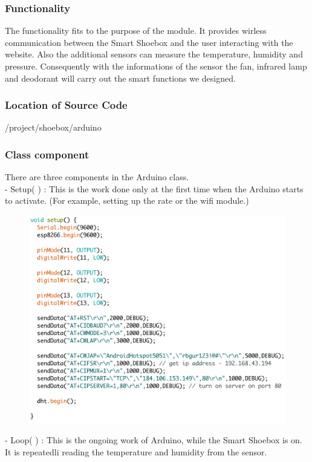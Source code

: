 \documentclass[conference]{IEEEtran}
\begin{document}
\subsubsection{Functionality} The functionality fits to the purpose of the module. It provides wirless communication between the Smart Shoebox and the user interacting with the website. Also the additional sensors can measure the temperature, humidity and pressure. Consequently with the informations of the sensor the fan, infrared lamp and deodorant will carry out the smart functions we designed.
\subsubsection{Location of Source Code}/project/shoebox/arduino
\subsubsection{Class component}There are three components in the Arduino class.
\\
- Setup( ) : This is the work done only at the first time when the Arduino starts to activate. 
(For example, setting up the rate or the wifi module.)
\begin{figure}[H]
\begin{center}
    \includegraphics[scale=0.44]{setup}
  \label{fig:label}
\end{center}
\end{figure}
- Loop( ) : This is the ongoing work of Arduino, while the Smart Shoebox is on. It is repeatedli reading the temperature and humidity from the sensor.
\end{document}
